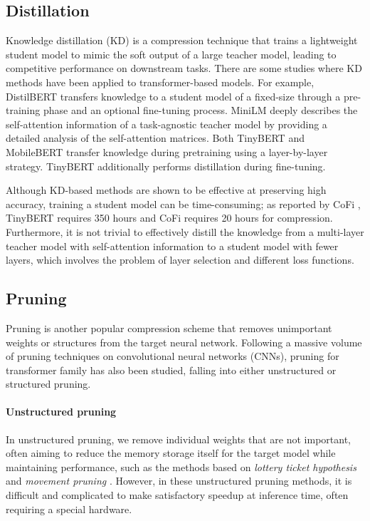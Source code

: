 \subsection{Distillation}
Knowledge distillation (KD) \cite{KD} is a compression technique that trains a lightweight student model to mimic the soft output of a large teacher model, leading to competitive performance on downstream tasks. There are some studies where KD methods have been applied to transformer-based models. For example, DistilBERT \cite{DistilB} transfers knowledge to a student model of a fixed-size through a pre-training phase and an optional fine-tuning process. MiniLM \cite{MiniLM} deeply describes the self-attention information of a task-agnostic teacher model by providing a detailed analysis of the self-attention matrices. Both TinyBERT \cite{TinyBERT} and MobileBERT \cite{MoB} transfer knowledge during pretraining using a layer-by-layer strategy. TinyBERT \cite{TinyBERT} additionally performs distillation during fine-tuning. 

Although KD-based methods are shown to be effective at preserving high accuracy, training a student model can be time-consuming; as reported by CoFi \cite{Xia}, TinyBERT \cite{TinyBERT} requires 350 hours and CoFi \cite{Xia} requires 20 hours for compression. Furthermore, 
it is not trivial to effectively distill the knowledge from a multi-layer teacher model with self-attention information to a student model with fewer layers, which involves the problem of layer selection and different loss functions.


\subsection{Pruning}
Pruning \cite{Han} is another popular compression scheme that removes unimportant weights or structures from the target neural network. Following a massive volume of pruning techniques on convolutional neural networks (CNNs), pruning for transformer family has also been studied, falling into either unstructured or structured pruning.

\paragraph{Unstructured pruning} 
In unstructured pruning, we remove individual weights that are not important, often aiming to reduce the memory storage itself for the target model while maintaining performance, such as the methods based on \textit{lottery ticket hypothesis} \cite{LoB} and \textit{movement pruning} \cite{Mov}. However, in these unstructured pruning methods, it is difficult and complicated to make satisfactory speedup at inference time, often requiring a special hardware.

